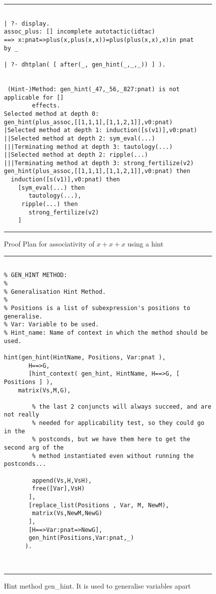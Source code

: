 \begin{figure}[htb] \begin{center} %
\hrule
\begin{small} 
\begin{verbatim} 

| ?- display.
assoc_plus: [] incomplete autotactic(idtac)
==> x:pnat=>plus(x,plus(x,x))=plus(plus(x,x),x)in pnat
by _

| ?- dhtplan( [ after(_, gen_hint(_,_,_)) ] ).


 (Hint-)Method: gen_hint(_47,_56,_827:pnat) is not applicable for []
        effects.
Selected method at depth 0:
gen_hint(plus_assoc,[[1,1,1],[1,1,2,1]],v0:pnat)
|Selected method at depth 1: induction([s(v1)],v0:pnat)
||Selected method at depth 2: sym_eval(...)
|||Terminating method at depth 3: tautology(...)
||Selected method at depth 2: ripple(...)
|||Terminating method at depth 3: strong_fertilize(v2)
gen_hint(plus_assoc,[[1,1,1],[1,1,2,1]],v0:pnat) then
  induction([s(v1)],v0:pnat) then
    [sym_eval(...) then
       tautology(...),
     ripple(...) then
       strong_fertilize(v2)
    ]

\end{verbatim}
\end{small}
\end{center}
\caption{Proof Plan for associativity of $x+x+x$ using a hint}
\label{trix-plan}
\hrule
\end{figure}


\begin{figure}[htb] \begin{center} %
\hrule
\begin{small} 
\begin{verbatim} 

% GEN_HINT METHOD:
%
% Generalisation Hint Method. 
%
% Positions is a list of subexpression's positions to generalise.
% Var: Variable to be used. 
% Hint_name: Name of context in which the method should be used.
	
hint(gen_hint(HintName, Positions, Var:pnat ),
       H==>G,
       [hint_context( gen_hint, HintName, H==>G, [ Positions ] ),
 	matrix(Vs,M,G),

        % the last 2 conjuncts will always succeed, and are not really
        % needed for applicability test, so they could go in the
        % postconds, but we have them here to get the second arg of the
        % method instantiated even without running the postconds...

        append(Vs,H,VsH),
        free([Var],VsH)
       ], 
       [replace_list(Positions , Var, M, NewM),
        matrix(Vs,NewM,NewG)
       ],
       [H==>Var:pnat=>NewG],
       gen_hint(Positions,Var:pnat,_)
      ).



\end{verbatim}
\end{small}
\end{center}
\caption{Hint method gen\_hint. It is used to generalise variables
apart}
\label{gen-hint}
\hrule
\end{figure}


